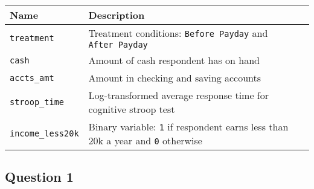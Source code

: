 \documentclass[
]{article}
\begin{document}
\begin{longtable}[]{@{}ll@{}}
\toprule
\begin{minipage}[b]{0.31\columnwidth}\raggedright
Name\strut
\end{minipage} & \begin{minipage}[b]{0.62\columnwidth}\raggedright
Description\strut
\end{minipage}\tabularnewline
\midrule
\endhead
\begin{minipage}[t]{0.31\columnwidth}\raggedright
\texttt{treatment}\strut
\end{minipage} & \begin{minipage}[t]{0.62\columnwidth}\raggedright
Treatment conditions: \texttt{Before\ Payday} and
\texttt{After\ Payday}\strut
\end{minipage}\tabularnewline
\begin{minipage}[t]{0.31\columnwidth}\raggedright
\texttt{cash}\strut
\end{minipage} & \begin{minipage}[t]{0.62\columnwidth}\raggedright
Amount of cash respondent has on hand\strut
\end{minipage}\tabularnewline
\begin{minipage}[t]{0.31\columnwidth}\raggedright
\texttt{accts\_amt}\strut
\end{minipage} & \begin{minipage}[t]{0.62\columnwidth}\raggedright
Amount in checking and saving accounts\strut
\end{minipage}\tabularnewline
\begin{minipage}[t]{0.31\columnwidth}\raggedright
\texttt{stroop\_time}\strut
\end{minipage} & \begin{minipage}[t]{0.62\columnwidth}\raggedright
Log-transformed average response time for cognitive stroop test\strut
\end{minipage}\tabularnewline
\begin{minipage}[t]{0.31\columnwidth}\raggedright
\texttt{income\_less20k}\strut
\end{minipage} & \begin{minipage}[t]{0.62\columnwidth}\raggedright
Binary variable: \texttt{1} if respondent earns less than 20k a year and
\texttt{0} otherwise\strut
\end{minipage}\tabularnewline
\bottomrule
\end{longtable}

\hypertarget{question-1}{%
\subsection{Question 1}\label{question-1}}
\end{document}
